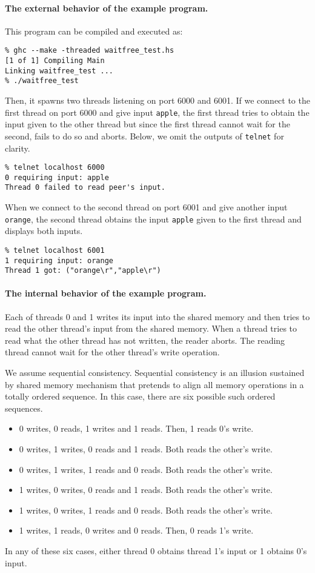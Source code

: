 \paragraph{The external behavior of the example program.}
  This program can be compiled and executed as:
\begin{verbatim}
% ghc --make -threaded waitfree_test.hs
[1 of 1] Compiling Main
Linking waitfree_test ...
% ./waitfree_test
\end{verbatim}
Then, it spawns two threads listening on port 6000 and 6001.
If we connect to the first thread on port 6000 and
give input \texttt{apple}, the first thread tries to obtain the input
given to the other
thread but since the first thread cannot wait for the second,
fails to do so and aborts.  Below, we omit the outputs of
\texttt{telnet} for clarity.
\begin{verbatim}
% telnet localhost 6000
0 requiring input: apple
Thread 0 failed to read peer's input.
\end{verbatim}
When we connect to the second thread on port 6001 and give another
input \texttt{orange}, the second thread obtains the input \texttt{apple}
given to the first thread and displays both inputs.
\begin{verbatim}
% telnet localhost 6001
1 requiring input: orange
Thread 1 got: ("orange\r","apple\r")
\end{verbatim}

\paragraph{The internal behavior of the example program.}

Each of threads 0 and 1 writes its input into the shared memory and then
tries to read the other thread's input from the shared memory.  When
a thread tries to read what the other thread has not written, the reader aborts.
The reading thread cannot wait for the other thread's write
operation.

We assume sequential consistency.  Sequential consistency is an illusion
sustained by shared memory mechanism that pretends to align all memory
operations in a totally ordered sequence.  In this case, there are
six possible such ordered sequences.
\begin{itemize}
 \item 0 writes, 0 reads, 1 writes and 1 reads.  Then, 1 reads 0's write.
 \item 0 writes, 1 writes, 0 reads and 1 reads.  Both reads the other's write.
 \item 0 writes, 1 writes, 1 reads and 0 reads.  Both reads the other's write.
 \item 1 writes, 0 writes, 0 reads and 1 reads.  Both reads the other's write.
 \item 1 writes, 0 writes, 1 reads and 0 reads.  Both reads the other's write.
 \item 1 writes, 1 reads, 0 writes and 0 reads.  Then, 0 reads 1's write.
\end{itemize}
In any of these six cases, either thread 0 obtains thread 1's input or 1 obtains
0's input.

